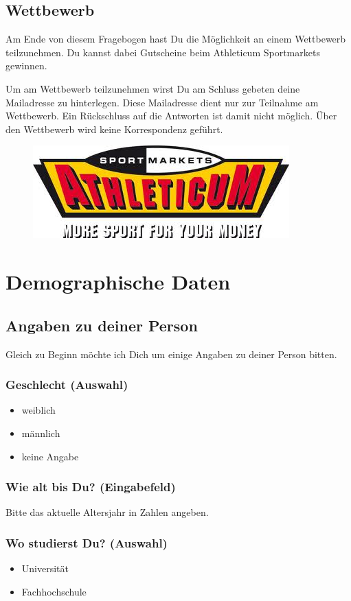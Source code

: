 \begin{RaggedRight}
\subsection*{Wettbewerb}
Am Ende von diesem Fragebogen hast Du die Möglichkeit an einem Wettbewerb teilzunehmen. Du kannst dabei Gutscheine beim Athleticum Sportmarkets gewinnen. \par
Um am Wettbewerb teilzunehmen wirst Du am Schluss gebeten deine Mailadresse zu hinterlegen. Diese Mailadresse dient nur zur Teilnahme am Wettbewerb. Ein Rückschluss auf die Antworten ist damit nicht möglich. Über den Wettbewerb wird keine Korrespondenz geführt.
\begin{figure}[h]
     \centering
     \includegraphics[scale=0.6]{images/anhang/sponsoring_athleticum_mittel.jpg}
\end{figure}
\section{Demographische Daten}\label{anhangSesction.demograpData}
\subsection*{Angaben zu deiner Person}
Gleich zu Beginn möchte ich Dich um einige Angaben zu deiner Person bitten.
\subsubsection*{Geschlecht (Auswahl)}
    \begin{itemize}
      \item weiblich
      \item männlich
      \item keine Angabe
    \end{itemize}
\end{RaggedRight}
\subsubsection*{Wie alt bis Du? (Eingabefeld)}
Bitte das aktuelle Altersjahr in Zahlen angeben.
\subsubsection*{Wo studierst Du? (Auswahl)}
    \begin{itemize}
      \item Universität
      \item Fachhochschule
    \end{itemize}
